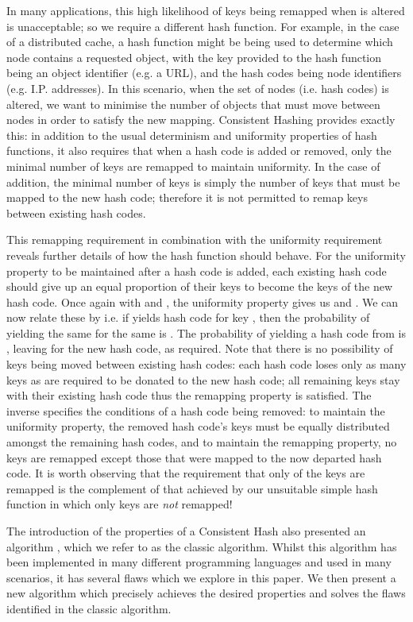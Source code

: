 \documentclass[runningheads,a4paper]{llncs}
\begin{document}
In many applications, this high likelihood of keys being remapped when
 is altered is unacceptable; so we require a different hash
function. For example, in the case of a distributed cache, a hash
function might be being used to determine which node contains a
requested object, with the key provided to the hash function being an
object identifier (e.g. a URL), and the hash codes being node
identifiers (e.g. I.P. addresses). In this scenario, when the set of
nodes (i.e. hash codes) is altered, we want to minimise the number of
objects that must move between nodes in order to satisfy the new
mapping. Consistent Hashing \cite{Karger1997} provides exactly this:
in addition to the usual determinism and uniformity properties of hash
functions, it also requires that when a hash code is added or removed,
only the minimal number of keys are remapped to maintain
uniformity. In the case of addition, the minimal number of keys is
simply the number of keys that must be mapped to the new hash code;
therefore it is not permitted to remap keys between existing hash
codes.

This remapping requirement in combination with the uniformity
requirement reveals further details of how the hash function should
behave. For the uniformity property to be maintained after a hash code
is added, each existing hash code should give up an equal proportion
of their keys to become the keys of the new hash code. Once again with
 and , the uniformity property gives us
 and . We can now relate these by  i.e. if  yields hash code
 for key , then the probability of 
yielding the same  for the same  is . The
probability of  yielding a hash code from  is , leaving  for the new hash code, as required. Note
that there is no possibility of keys being moved between existing hash
codes: each hash code loses only as many keys as are required to be
donated to the new hash code; all remaining keys stay with their
existing hash code thus the remapping property is satisfied. The
inverse specifies the conditions of a hash code being removed: to
maintain the uniformity property, the removed hash code's keys must be
equally distributed amongst the remaining hash codes, and to maintain
the remapping property, no keys are remapped except those that were
mapped to the now departed hash code. It is worth observing that the
requirement that only  of the keys are remapped is the
complement of that achieved by our unsuitable simple hash function in
which only  keys are {\em not} remapped!

The introduction of the properties of a Consistent Hash also presented
an algorithm \cite{Karger1997}, which we refer to as the classic
algorithm. Whilst this algorithm has been implemented in many
different programming languages and used in many scenarios, it has
several flaws which we explore in this paper. We then present a new
algorithm which precisely achieves the desired properties and solves
the flaws identified in the classic algorithm.
\end{document}

